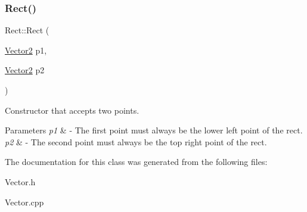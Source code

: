 \subsubsection{\texorpdfstring{Rect()}{Rect()}}
{\footnotesize\ttfamily Rect\+::\+Rect (\begin{DoxyParamCaption}\item[{\hyperlink{class_vector2}{Vector2}}]{p1,  }\item[{\hyperlink{class_vector2}{Vector2}}]{p2 }\end{DoxyParamCaption})}



Constructor that accepts two points. 


\begin{DoxyParams}{Parameters}
{\em p1} & -\/ The first point must always be the lower left point of the rect. \\
\hline
{\em p2} & -\/ The second point must always be the top right point of the rect. \\
\hline
\end{DoxyParams}


The documentation for this class was generated from the following files\+:\begin{DoxyCompactItemize}
\item 
Vector.\+h\item 
Vector.\+cpp\end{DoxyCompactItemize}
